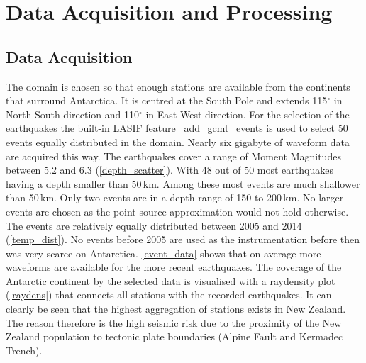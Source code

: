 
\chapter{Data Acquisition and Processing}

\section{Data Acquisition}

The domain is chosen so that enough stations are available from the continents that surround Antarctica.
It is centred at the South Pole and extends 115$^\circ$ in North-South direction and 110$^\circ$ in
East-West direction. 
For the selection of the earthquakes the built-in LASIF feature \
add\_gcmt\_events is used to select 50 events equally distributed in the
domain. %
Nearly six gigabyte of waveform data are acquired this way.
The earthquakes cover a range of Moment Magnitudes between 5.2 and 6.3 (\autoref{depth_scatter}). 
With 48 out of 50 most earthquakes having a depth smaller than 50\,km. Among these most 
events are much shallower than 50\,km. Only two events are in a depth range of 150 to 200\,km. 
No larger events are chosen as the point source approximation would not hold otherwise. 
The events are relatively equally distributed between 2005 and 2014 (\autoref{temp_dist}). 
No events before 2005 are used as the instrumentation before then was very scarce on Antarctica. 
\autoref{event_data} shows that on average more waveforms are available for the more recent earthquakes.
The coverage of the Antarctic continent by the selected data is visualised with a raydensity plot (\autoref{raydens}) 
that connects all stations with the recorded earthquakes. It can clearly be seen that the highest aggregation of stations 
exists in New Zealand. The reason therefore is the high seismic risk due to the proximity of the New Zealand population to tectonic plate boundaries (Alpine Fault and Kermadec Trench). \\




